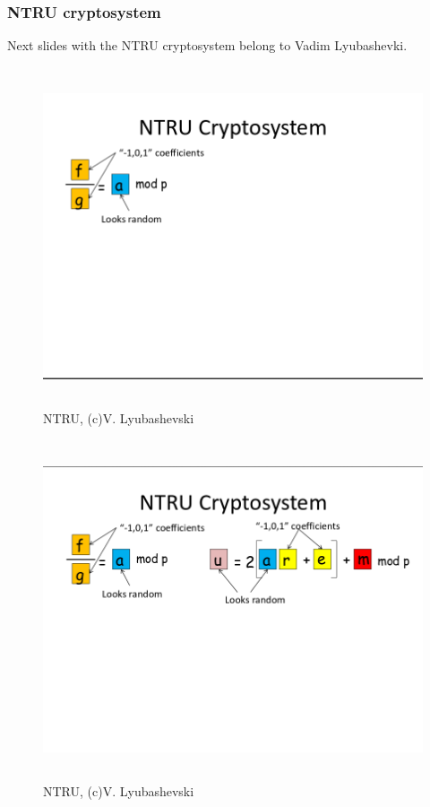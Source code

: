 \documentclass{beamer}
\begin{document}
\begin{frame}
    \frametitle{NTRU cryptosystem}
    Next slides with the NTRU cryptosystem belong to Vadim Lyubashevki.
\end{frame}
\begin{frame}
    \begin{figure}
            \includegraphics[width=12cm,height=10cm,keepaspectratio]{img/vadim1.png}
            \caption{NTRU, (c)V. Lyubashevski}
        \end{figure}
\end{frame}

\begin{frame}
    \begin{figure}
            \includegraphics[width=12cm,height=10cm,keepaspectratio]{img/vadim2.png}
            \caption{NTRU, (c)V. Lyubashevski}
        \end{figure}
\end{frame}
\end{document}
